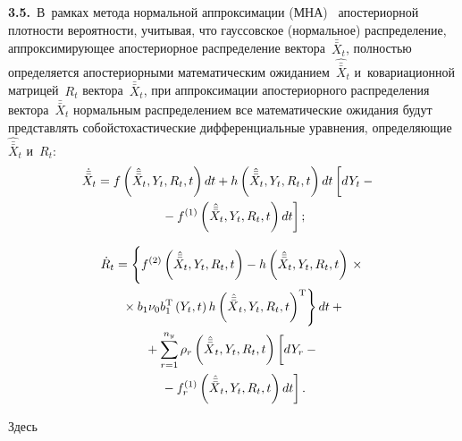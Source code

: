 \begin{multicols}{2}
\smallskip

\textbf{3.5.}\ В~рамках метода нормальной аппроксимации (МНА)~\cite{6-sin} 
апостериорной плотности вероятности, учитывая, что
гауссовское (нормальное) распределение, аппроксимирующее
апостериорное распределение вектора~$\bar{\bar X}_t$, полностью определяется
апостериорными математическим ожиданием~$\hat{\bar{\bar X}}_t$\linebreak 
и~ковариационной мат\-ри\-цей~$R_t$ вектора~$\bar{\bar X}_t$, при аппроксимации
апостериорного распределения вектора~$\bar{\bar X}_t$ нормальным
распределением все математические ожидания будут
представлять собой\linebreak \mbox{стохастические} дифференциальные уравнения,
опре\-де\-ля\-ющие~$\hat{\bar{\bar X}}_t$ и~$R_t$:
 \begin{multline}
 \hspace*{-5pt}\dot{\bar{\bar X}}_t = f \left(\hat{\bar{\bar X}}_t, Y_t,R_t,t\right)dt +
      h\left(\hat{\bar{\bar X}}_t,Y_t, R_t,t\right)dt\left[ 
      \vphantom{\left(\hat{\bar{\bar X}}_t,Y_t,
    R_t,t\right)}
    dY_t -{}\right.\\
\left.    {}- f^{(1)} \left(\hat{\bar{\bar X}}_t,Y_t,
    R_t,t\right)dt\right];
    \label{e3.29-sin}
    \end{multline}
    
     \vspace*{-12pt}
     
     \noindent
     \begin{multline}
     \dot R_t=\left\{
     \vphantom{\left({\hat{\bar{\bar X}}}_t, Y_t,R_t,t\right)^{\mathrm{T}}}
      f^{(2)}\left(\hat{\bar{\bar X}}_t, Y_t,R_t,t\right)-
     h\left(\hat{\bar{\bar X}}_t, Y_t,R_t,t\right)\right.\times{}\\
     \left.{}\times b_1\nu_0 b_1^{\mathrm{T}} \left(Y_t,t\right)
          h \left({\hat{\bar{\bar X}}}_t, Y_t,R_t,t\right)^{\mathrm{T}}\right\} dt+{}\\
          {}+
     \sss_{r=1}^{n_y} \rho_r \left({\hat{\bar{\bar X}}}_t,Y_t, R_t,t\right)\left[
     \vphantom{\left({\hat{\bar{\bar X}}}_t,Y_t, R_t,t\right)}
    dY_r -{}\right.\\
\left.    {}-f_r^{(1)}\left({\hat{\bar{\bar X}}}_t,Y_t, R_t,t\right) dt\right].
\label{e3.30-sin}
    \end{multline}
    
    \vspace*{-4pt}
    
\noindent
Здесь


\end{multicols}
